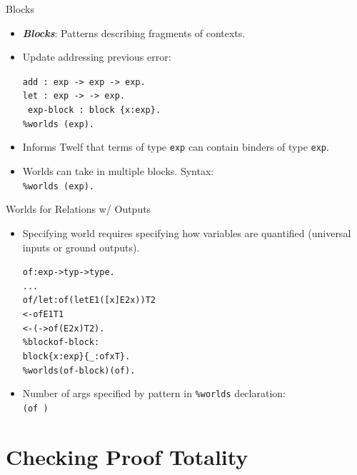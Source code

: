\documentclass{beamer}
\renewcommand{\emph}[1]{\textbf{\textit{#1}}}
\begin{document}
\begin{frame}{Blocks}
\begin{itemize}
\item \emph{Blocks}: Patterns describing fragments of contexts.
\item Update addressing previous error:

\texttt{add : exp -> exp -> exp.} \\
\texttt{let : exp ->  -> exp.} \\
\texttt{ exp-block : block \{x:exp\}.} \\
\texttt{\%worlds  (exp).}

\item Informs Twelf that terms of type \texttt{exp}
can contain binders of type \texttt{exp}.

\pause
\item Worlds can take in multiple blocks. Syntax: \\
\texttt{\%worlds  (exp).}

\end{itemize}
\end{frame}


\begin{frame}[containsverbatim]{Worlds for Relations w/ Outputs}
\begin{itemize}
\item Specifying world requires specifying how variables
are quantified (universal inputs or ground outputs).

\begin{alltt}
of : exp -> typ -> type.
...
of/let : of (let E1 ([x] E2 x)) T2
  <- of E1 T1
  <- ( -> of (E2 x) T2).
\%block of-block :
   block \{x: exp\}\{_: of x T\}.
\%worlds (of-block) (of \cemph{_ _}).
\end{alltt}

\item Number of args specified by pattern in \texttt{\%worlds}
declaration: \\
\texttt{(of \cemph{\_ \_})}
\end{itemize}
\end{frame}

\section{Checking Proof Totality}
\end{document}
